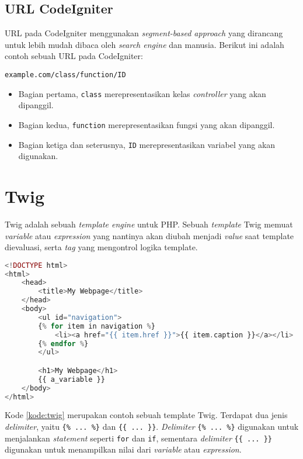 \subsection{URL CodeIgniter}
\label{subs:ciurl}

URL pada CodeIgniter menggunakan \textit{segment-based approach} yang dirancang untuk lebih mudah dibaca oleh \textit{search engine} dan manusia. Berikut ini adalah contoh sebuah URL pada CodeIgniter:
\begin{center}
    \verb|example.com/class/function/ID|    
\end{center}
\begin{itemize}
	\item Bagian pertama, \verb|class| merepresentasikan kelas \textit{controller} yang akan dipanggil.
	\item Bagian kedua,  \verb|function| merepresentasikan fungsi yang akan dipanggil.
	\item Bagian ketiga dan seterusnya, \verb|ID| merepresentasikan variabel yang akan digunakan.
\end{itemize}

\section{Twig}
\label{sec:twig}

Twig adalah sebuah \textit{template engine} untuk PHP. Sebuah \textit{template} Twig memuat \textit{variable} atau \textit{expression} yang nantinya akan diubah menjadi \textit{value} saat template dievaluasi, serta \textit{tag} yang mengontrol logika template.

\begin{lstlisting}[language=php, caption=Contoh template Twig, label=kode:twig]
<!DOCTYPE html>
<html>
    <head>
        <title>My Webpage</title>
    </head>
    <body>
        <ul id="navigation">
        {% for item in navigation %}
            <li><a href="{{ item.href }}">{{ item.caption }}</a></li>
        {% endfor %}
        </ul>

        <h1>My Webpage</h1>
        {{ a_variable }}
    </body>
</html>
\end{lstlisting}

Kode \ref{kode:twig} merupakan contoh sebuah template Twig. Terdapat dua jenis \textit{delimiter}, yaitu \verb|{% ... %}| dan \verb|{{ ... }}|. \textit{Delimiter} \verb|{% ... %}| digunakan untuk menjalankan \textit{statement} seperti \verb|for| dan \verb|if|, sementara \textit{delimiter} \verb|{{ ... }}| digunakan untuk menampilkan nilai dari \textit{variable} atau \textit{expression}.

